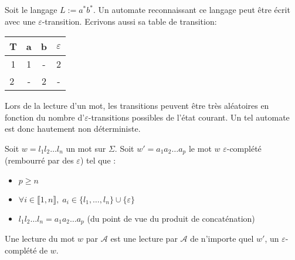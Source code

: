 \begin{example}
    Soit le langage $L := a^*b^*$. Un automate reconnaissant ce langage peut être écrit avec une 
    $\varepsilon$-transition. Ecrivons aussi sa table de transition: 
    \begin{center}
        \begin{minipage}{0.45\textwidth} %
        \end{minipage}%
        \hfill 
        \begin{minipage}{0.45\textwidth} %
            \begin{tabular}{c|c|c|c}
                T & a & b & $\varepsilon$ \\ \hline 
                1 & 1 & - & 2 \\ \hline 
                \textcircled{2} & - & 2 & - \\ \hline 
            \end{tabular}
        \end{minipage}
    \end{center}
\end{example}

Lors de la lecture d'un mot, les transitions peuvent être très aléatoires en fonction du nombre 
d'$\varepsilon$-transitions possibles de l'état courant. Un tel automate est donc hautement non déterministe. 

\newpage 

\begin{definition}
    Soit $w = l_1 l_2 \dots l_n $ un mot sur $\Sigma$. 
    Soit $w' = a_1 a_2 \dots a_p$ le mot $w$ $\varepsilon$-complété (rembourré par des $\varepsilon$) tel que :
    \begin{itemize}
        \item $p \geqslant n$ 
        \item $ \forall i \in \llbracket 1, n \rrbracket, \; a_i \in \{l_1, \dots, l_n\} \cup \{\varepsilon\}$ 
        \item $l_1 l_2 \dots l_n = a_1 a_2 \dots a_p$ (du point de vue du produit de concaténation)
    \end{itemize}
    Une lecture du mot $w$ par $ \mathcal{A}$ est une lecture par $ \mathcal{A}$ de n'importe quel $w'$, 
    un $\varepsilon$-complété de $w$. 
\end{definition}

